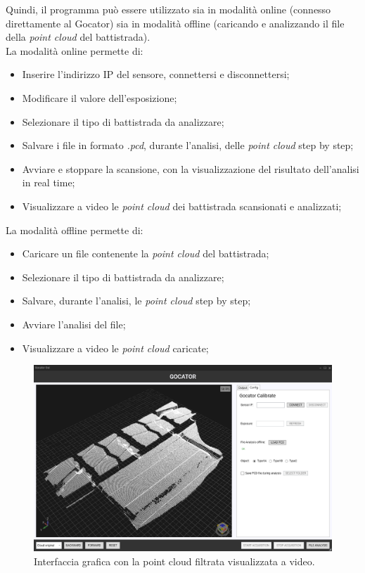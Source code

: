 \noindent Quindi, il programma può essere utilizzato sia in modalità online (connesso direttamente al Gocator) sia in modalità offline (caricando e analizzando il file della \textit{point cloud} del battistrada).\\
\newline
La modalità online permette di:

\begin{itemize}
	\item Inserire l'indirizzo IP del sensore, connettersi e disconnettersi;
	\item Modificare il valore dell'esposizione;
	\item Selezionare il tipo di battistrada da analizzare;
	\item Salvare i file in formato \textit{.pcd}, durante l'analisi, delle \textit{point cloud} step by step;
	\item Avviare e stoppare la scansione, con la visualizzazione del risultato dell'analisi in real time;
	\item Visualizzare a video le \textit{point cloud} dei battistrada scansionati e analizzati;
\end{itemize}

\noindent La modalità offline permette di:

\begin{itemize}
	\item Caricare un file contenente la \textit{point cloud} del battistrada;
	\item Selezionare il tipo di battistrada da analizzare;
	\item Salvare, durante l'analisi, le \textit{point cloud} step by step;
	\item Avviare l'analisi del file;
	\item Visualizzare a video le \textit{point cloud} caricate;
\end{itemize}

\begin{figure}[H]
	\centering
	\includegraphics[width=0.9\columnwidth]{./pictures/gui_3.png}
	\caption{Interfaccia grafica con la point cloud filtrata visualizzata a video.}\label{fig:gui_2}
\end{figure}

